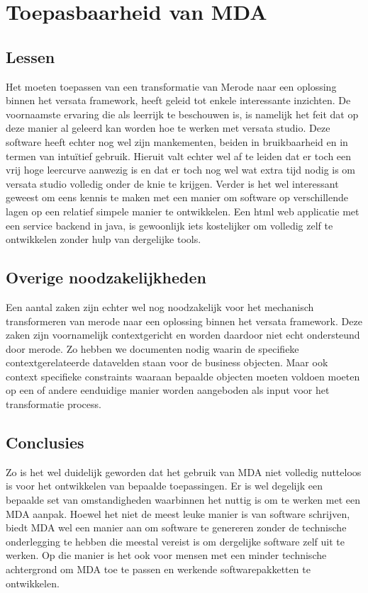 \section{Toepasbaarheid van MDA}
\subsection{Lessen}
Het moeten toepassen van een transformatie van Merode naar een oplossing binnen het versata framework, heeft geleid tot enkele
interessante inzichten. 
De voornaamste ervaring die als leerrijk te beschouwen is, is namelijk het feit dat op deze manier al geleerd kan worden hoe te werken met versata studio. 
Deze software heeft echter nog wel zijn mankementen, beiden in bruikbaarheid en in termen van intu\"itief gebruik. Hieruit valt echter wel af te leiden dat er toch een vrij hoge leercurve aanwezig is en dat er toch nog wel wat extra tijd nodig is om versata studio volledig onder de knie te krijgen.
Verder is het wel interessant geweest om eens kennis te maken met een manier om software op verschillende lagen op een relatief simpele manier te ontwikkelen. Een html web applicatie met een service backend in java, is gewoonlijk iets kostelijker om volledig zelf te ontwikkelen zonder hulp van dergelijke tools.
\subsection{Overige noodzakelijkheden}
Een aantal zaken zijn echter wel nog noodzakelijk voor het mechanisch transformeren van merode naar een oplossing binnen het versata framework. Deze zaken zijn voornamelijk contextgericht en worden daardoor niet echt ondersteund door merode.
Zo hebben we documenten nodig waarin de specifieke contextgerelateerde datavelden staan voor de business objecten. 
Maar ook context specifieke constraints waaraan bepaalde objecten moeten voldoen moeten op een of andere eenduidige manier worden aangeboden als input voor het transformatie process.
\subsection{Conclusies}
Zo is het wel duidelijk geworden dat het gebruik van MDA niet volledig nutteloos is voor het ontwikkelen van bepaalde toepassingen. 
Er is wel degelijk een bepaalde set van omstandigheden waarbinnen het nuttig is om te werken met een MDA aanpak. 
Hoewel het niet de meest leuke manier is van software schrijven, biedt MDA wel een manier aan om software te genereren zonder de technische onderlegging te hebben die meestal vereist is om dergelijke software zelf uit te werken. 
Op die manier is het ook voor mensen met een minder technische achtergrond om MDA toe te passen en werkende softwarepakketten te ontwikkelen.
